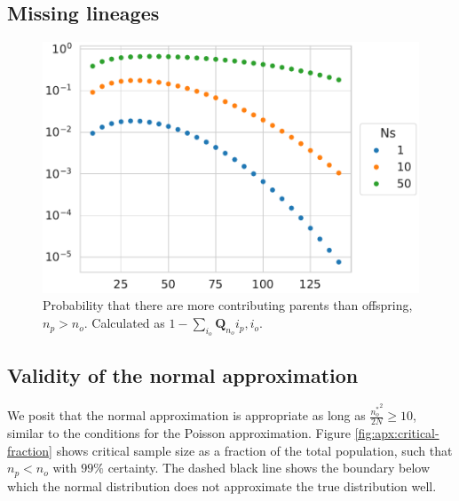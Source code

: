 \documentclass[review]{elsarticle}
\newcommand{\sgcomment}[1]{{\color{red}{SG: #1}}}
\begin{document}
\subsection{Missing lineages}

\begin{figure}
  \centering
  \includegraphics[width=\textwidth]{fig/missing.pdf}
  \caption{Probability that there are more contributing parents than offspring, $n_p > n_o$. \sgcomment{Missing information, such as $N$}
    Calculated as $1-\sum_{i_o} \mathbf{Q}_{n_o}{i_p, i_o}.$}
  \label{fig:apx:missing}
\end{figure}

\subsection{Validity of the normal approximation}

We posit that the normal approximation is appropriate as long as $\frac{{n_o^*}^2}{2N} \ge 10$,
similar to the conditions for the Poisson approximation. Figure \ref{fig:apx:critical-fraction}
shows critical sample size as a fraction of the total population, such that $n_p < n_o$ with $99\%$
certainty. The dashed black line shows the boundary below which the normal distribution does not
approximate the true distribution well.
\end{document}
